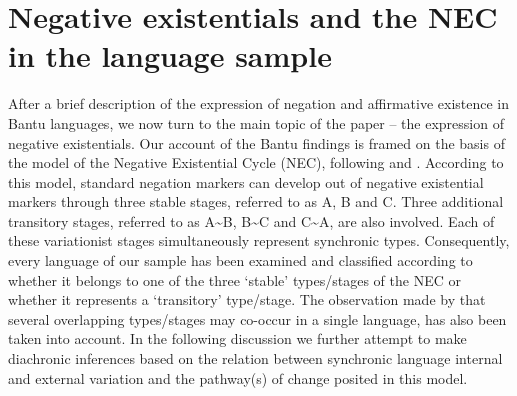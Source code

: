 \documentclass[output=paper]{langsci/langscibook}
\begin{document}
\section{Negative existentials and the NEC in the language sample}\label{sec:1:4}
After a brief description of the expression of negation and affirmative
existence in Bantu languages, we now turn to the main topic of the paper –
the expression of negative existentials. Our account of the Bantu findings
is framed on the basis of the model of the Negative Existential Cycle
(NEC), following \citet{Croft1991} and
\textcites{Veselinova2013}{Veselinova2014}{Veselinova2016}. According to this
model, standard negation markers can develop out of negative existential
markers through three stable stages, referred to as A, B and C. Three
additional transitory stages, referred to as A{\textasciitilde}B,
B{\textasciitilde}C and C{\textasciitilde}A, are also involved. Each of
these variationist stages simultaneously represent synchronic types.
Consequently, every language of our sample has been examined and classified
according to whether it belongs to one of the three `stable' types/stages
of the NEC or whether it represents a `transitory' type/stage. The
observation made by \textcites{Veselinova2014,Veselinova2016} that several
overlapping types/stages may co-occur in a single language, has also been
taken into account. In the following discussion we further attempt to make
diachronic inferences based on the relation between synchronic language
internal and external variation and the pathway(s) of change posited in this model.
\end{document}
